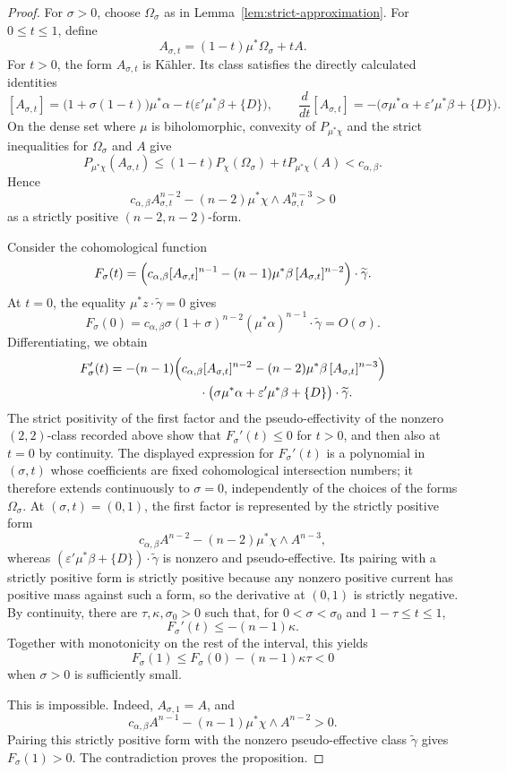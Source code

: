 \documentclass[reqno]{amsart}
\newcommand{\cab}{c_{\alpha,\beta}}
\theoremstyle{plain}
\theoremstyle{remark}
\begin{document}
\begin{proof}
For $\sigma>0$, choose $\Omega_\sigma$ as in
Lemma~\ref{lem:strict-approximation}. For $0\leq t\leq1$, define
\[
 A_{\sigma,t}=(1-t)\mu^*\Omega_\sigma+tA.
\]
For $t>0$, the form $A_{\sigma,t}$ is K\"ahler.  Its class satisfies
the directly calculated identities
\[
 [A_{\sigma,t}]
 =\bigl(1+\sigma(1-t)\bigr)\mu^*\alpha
  -t\bigl(\varepsilon'\mu^*\beta+\{D\}\bigr),
 \qquad
 \frac d{dt}[A_{\sigma,t}]
 =-\bigl(\sigma\mu^*\alpha+\varepsilon'\mu^*\beta+\{D\}\bigr).
\]
On the dense set where $\mu$ is biholomorphic, convexity of
$P_{\mu^*\chi}$ and the strict inequalities for $\Omega_\sigma$ and
$A$ give
\[
 P_{\mu^*\chi}(A_{\sigma,t})
 \leq(1-t)P_\chi(\Omega_\sigma)
      +tP_{\mu^*\chi}(A)<\cab.
\]
Hence
\[
 \cab A_{\sigma,t}^{n-2}
 -(n-2)\mu^*\chi\wedge A_{\sigma,t}^{n-3}
 >0
\]
as a strictly positive $(n-2,n-2)$-form.

Consider the cohomological function
\[
 F_\sigma(t)=
 \Bigl(\cab[A_{\sigma,t}]^{n-1}
 -(n-1)\mu^*\beta\,[A_{\sigma,t}]^{n-2}\Bigr)
 \cdot\widetilde\gamma.
\]
At $t=0$, the equality $\mu^*z\cdot\widetilde\gamma=0$ gives
\[
 F_\sigma(0)
 =\cab\sigma(1+\sigma)^{n-2}
   (\mu^*\alpha)^{n-1}\cdot\widetilde\gamma=O(\sigma).
\]
Differentiating, we obtain
\begin{align*}
 F_\sigma'(t)=-(n-1)
 &\Bigl(\cab[A_{\sigma,t}]^{n-2}
 -(n-2)\mu^*\beta\,[A_{\sigma,t}]^{n-3}\Bigr)\\
 &\qquad\cdot
 \bigl(\sigma\mu^*\alpha+\varepsilon'\mu^*\beta+\{D\}\bigr)
 \cdot\widetilde\gamma.
\end{align*}
The strict positivity of the first factor and the pseudo-effectivity of
the nonzero $(2,2)$-class recorded above show that
$F_\sigma'(t)\leq0$ for $t>0$, and then also at $t=0$ by
continuity. The displayed expression for $F_\sigma'(t)$ is a
polynomial in $(\sigma,t)$ whose coefficients are fixed
cohomological intersection numbers; it therefore extends continuously
to $\sigma=0$, independently of the choices of the forms
$\Omega_\sigma$. At
$(\sigma,t)=(0,1)$, the first factor is represented by the strictly
positive form
\[
 \cab A^{n-2}-(n-2)\mu^*\chi\wedge A^{n-3},
\]
whereas
$(\varepsilon'\mu^*\beta+\{D\})\cdot\widetilde\gamma$ is nonzero
and pseudo-effective. Its pairing with a strictly positive form is
strictly positive because any nonzero positive current has positive
mass against such a form,
so the derivative at $(0,1)$ is strictly negative.  By continuity,
there are
$\tau,\kappa,\sigma_0>0$ such that, for
$0<\sigma<\sigma_0$ and $1-\tau\leq t\leq1$,
\[
 F_\sigma'(t)\leq-(n-1)\kappa.
\]
Together with monotonicity on the rest of the interval, this yields
\[
 F_\sigma(1)
 \leq F_\sigma(0)-(n-1)\kappa\tau<0
\]
when $\sigma>0$ is sufficiently small.

This is impossible.  Indeed, $A_{\sigma,1}=A$, and
\[
 \cab A^{n-1}-(n-1)\mu^*\chi\wedge A^{n-2}>0.
\]
  Pairing this strictly positive
form with the nonzero pseudo-effective class
$\widetilde\gamma$ gives $F_\sigma(1)>0$.  The contradiction proves
the proposition.
\end{proof}
\end{document}
